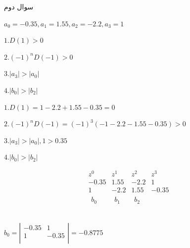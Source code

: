\documentclass[12pt]{article}
\begin{document}
    \begin{problem}{سوال دوم}
    	\raggedleft
    	
    	$a_0 = -0.35 , a_1 = 1.55 , a_2 = -2.2 , a_3 = 1$
    	
    	
    	\centering
    	$1. D(1) > 0$
    	
    	$2. (-1)^nD(-1) > 0$
    	
    	$3. |a_3| > |a_0|$
    	
    	$4. |b_0| > |b_2| $
    	
    	\raggedleft
    	$1. D(1) = 1-2.2+1.55-0.35 = 0$
    	
    	
    	
    	$2. (-1)^nD(-1) =  (-1)^3(-1-2.2-1.55-0.35) > 0$
    	
    	$3. |a_3| > |a_0| , 1 > 0.35$
    	
    	$4. |b_0| > |b_2| $
    	
    	
    	\centering
    	\[\begin{matrix}
    		{{z}^{0}} & {{z}^{1}} & {{z}^{2}} & {{z}^{3}}  \\
    		-0.35 & 1.55 & -2.2 & 1  \\
    		1 & -2.2 & 1.55 & -0.35  \\
    		\begin{matrix}
    			{{b}_{0}}  \\
    			{}  \\
    		\end{matrix} & \begin{matrix}
    			{{b}_{1}}  \\
    			{}  \\
    		\end{matrix} & \begin{matrix}
    			{{b}_{2}}  \\
    			{}  \\
    		\end{matrix} & {}  \\
    	\end{matrix}\]
    	
    	\raggedleft
    	${{b}_{0}}=\left| \begin{matrix}
    		-0.35 & 1  \\
    		1 & -0.35  \\
    	\end{matrix} \right| = -0.8775$
    	

\end{problem}
\end{document}
